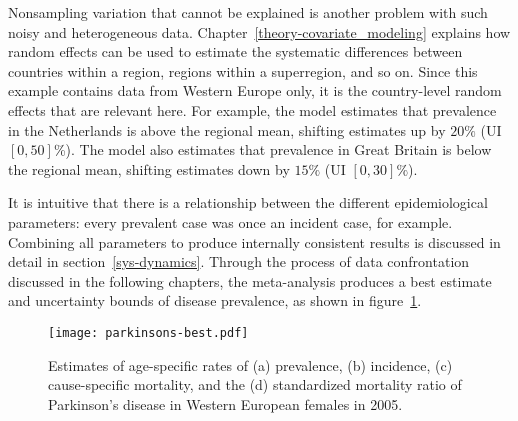 Nonsampling variation that cannot be explained is another problem with
such noisy and heterogeneous data.  Chapter~\ref{theory-covariate_modeling}
explains how random effects can be used
to estimate the systematic differences between countries within a
region, regions within a superregion, and so on.  Since this example
contains data from Western Europe only, it is the country-level random
effects that are relevant here.  For example, the model estimates that
prevalence in the Netherlands is above the regional mean, shifting
estimates up by $20\%$ (UI $[0, 50]$\%).  The model also estimates
that prevalence in Great Britain is below the regional mean, shifting estimates
down by $15\%$ (UI $[0, 30]\%$).

It is intuitive that there is a relationship between the
different epidemiological parameters: every prevalent case was once an incident
case, for example.  Combining all parameters to produce internally
consistent results is discussed in detail in section~\ref{sys-dynamics}.
Through the process of data confrontation
discussed in the following chapters, the meta-analysis produces a best
estimate and uncertainty bounds of disease prevalence, as shown in
figure~\ref{fig:intro-parkinsons fit}.

    \begin{figure}[h]
        \begin{center}
            \texttt{[image: parkinsons-best.pdf]}
            \caption{Estimates of age-specific rates of
              (a) prevalence, (b) incidence,
              (c) cause-specific mortality, and the
              (d) standardized mortality ratio of Parkinson's
              disease in Western European females in 2005.}
            \label{fig:intro-parkinsons fit}
        \end{center}
    \end{figure}
